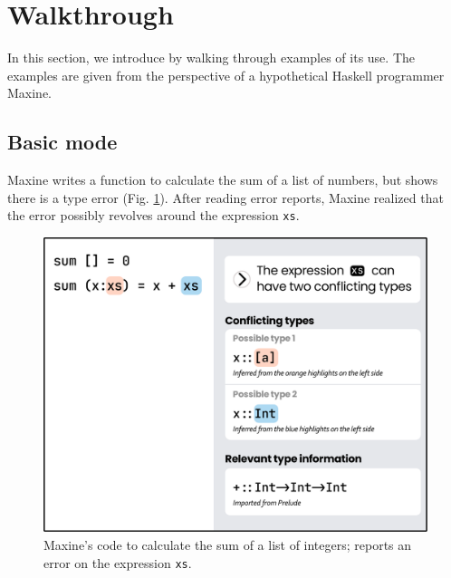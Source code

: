 \section{Walkthrough} \label{sec:walkthrough}
In this section, we introduce \chameleon{} by walking through examples of its
use. The examples are given from the perspective of a hypothetical Haskell 
programmer Maxine. 


\subsection{Basic mode} \label{sub:basic}
Maxine writes a function to calculate the sum of a list of
numbers, but \chameleon{} shows there is a type error (Fig. \ref{fig:basic-mode-1}). 
After reading error reports, Maxine realized that the error possibly revolves 
around the expression \texttt{xs}.

\begin{figure}[h]
        \centering
        \includegraphics[width=\linewidth]{images/basic-mode-1.pdf}
        \caption{
            Maxine's code to calculate the sum of a list of integers;
            \chameleon{} reports an error on the expression \texttt{xs}.
            }
            \label{fig:basic-mode-1}
\end{figure}

